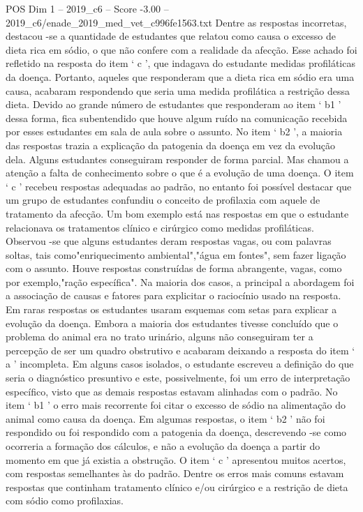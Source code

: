 \begin{textsample}{POS Dim 1 – 2019\_c6 – Score -3.00 – 2019\_c6/enade\_2019\_med\_vet\_c996fe1563.txt}
Dentre as respostas incorretas, destacou -se a quantidade de estudantes que relatou como causa o excesso de dieta rica em sódio, o que não confere com a realidade da afecção.
Esse achado foi refletido na resposta do item ‘ c ’, que indagava do estudante medidas profiláticas da doença.
Portanto, aqueles que responderam que a dieta rica em sódio era uma causa, acabaram respondendo que seria uma medida profilática a restrição dessa dieta.
Devido ao grande número de estudantes que responderam ao item ‘ b1 ’ dessa forma, fica subentendido que houve algum ruído na comunicação recebida por esses estudantes em sala de aula sobre o assunto.
No item ‘ b2 ’, a maioria das respostas trazia a explicação da patogenia da doença em vez da evolução dela.
Alguns estudantes conseguiram responder de forma parcial.
Mas chamou a atenção a falta de conhecimento sobre o que é a evolução de uma doença.
O item ‘ c ’ recebeu respostas adequadas ao padrão, no entanto foi possível destacar que um grupo de estudantes confundiu o conceito de profilaxia com aquele de tratamento da afecção.
Um bom exemplo está nas respostas em que o estudante relacionava os tratamentos clínico e cirúrgico como medidas profiláticas.
Observou -se que alguns estudantes deram respostas vagas, ou com palavras soltas, tais como"enriquecimento ambiental","água em fontes", sem fazer ligação com o assunto.
Houve respostas construídas de forma abrangente, vagas, como por exemplo,"ração específica".
Na maioria dos casos, a principal a abordagem foi a associação de causas e fatores para explicitar o raciocínio usado na resposta.
Em raras respostas os estudantes usaram esquemas com setas para explicar a evolução da doença.
Embora a maioria dos estudantes tivesse concluído que o problema do animal era no trato urinário, alguns não conseguiram ter a percepção de ser um quadro obstrutivo e acabaram deixando a resposta do item ‘ a ’ incompleta.
Em alguns casos isolados, o estudante escreveu a definição do que seria o diagnóstico presuntivo e este, possivelmente, foi um erro de interpretação específico, visto que as demais respostas estavam alinhadas com o padrão.
No item ‘ b1 ’ o erro mais recorrente foi citar o excesso de sódio na alimentação do animal como causa da doença.
Em algumas respostas, o item ‘ b2 ’ não foi respondido ou foi respondido com a patogenia da doença, descrevendo -se como ocorreria a formação dos cálculos, e não a evolução da doença a partir do momento em que já existia a obstrução.
O item ‘ c ’ apresentou muitos acertos, com respostas semelhantes às do padrão.
Dentre os erros mais comuns estavam respostas que continham tratamento clínico e/ou cirúrgico e a restrição de dieta com sódio como profilaxias.

\end{textsample}
